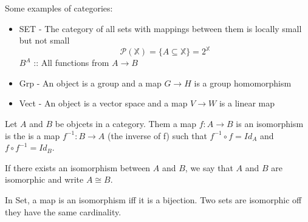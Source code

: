Some examples of categories:
\begin{itemize}
\item SET - The category of all sets with mappings between them is locally small but not small
  $$ \mathcal{P}(\mathbb{X}) = \{A \subseteq \mathbb{X}\} = 2^{\mathbb{X}} $$
  $ B^A $ :: All functions from $A \rightarrow B $
\item Grp - An object is a group and a map $ G \rightarrow H $ is a group homomorphism
\item Vect - An object is a vector space and a map $ V \rightarrow W $ is a linear map
\end{itemize}

\begin{definition}
  Let $A$ and $B$ be objcets in a category. Them a map $f : A \rightarrow B$ is an
  isomorphism is the is a map $ f^{-1}  : B \rightarrow A $ (the inverse of f) such that
  $f^{-1} \circ f = Id_A $ and $f \circ f^{-1} = Id_B$.

  If there exists an isomorphism between $A$ and $B$,
  we say that $A$ and $B$ are isomorphic and write $A \cong B$.
\end{definition}

\begin{proposition}
  In Set, a map is an isomorphism iff it is a bijection. Two sets are isomorphic
  off they have the same cardinality.
\end{proposition}

